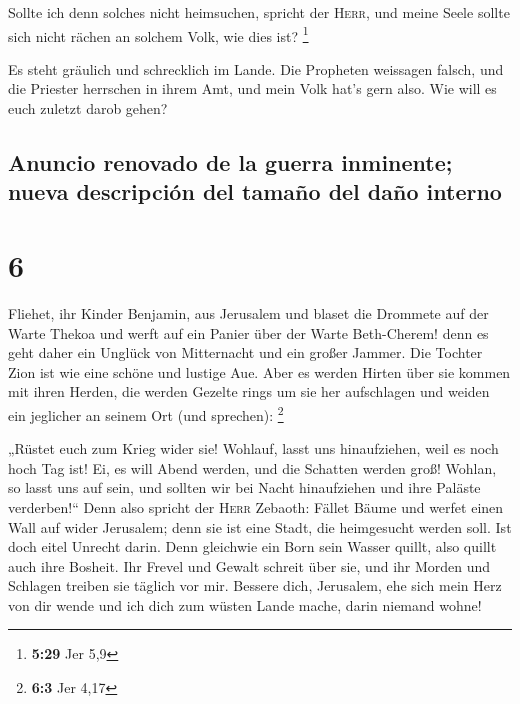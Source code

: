  Sollte ich denn solches nicht heimsuchen, spricht der
\textsc{Herr}, und meine Seele sollte sich nicht rächen an solchem Volk,
wie dies ist? \footnote{\textbf{5:29} Jer 5,9}

 Es steht gräulich und schrecklich im Lande.
 Die Propheten weissagen falsch, und die Priester
herrschen in ihrem Amt, und mein Volk hat's gern also. Wie will es euch
zuletzt darob gehen?

\hypertarget{anuncio-renovado-de-la-guerra-inminente-nueva-descripciuxf3n-del-tamauxf1o-del-dauxf1o-interno}{%
\subsection{Anuncio renovado de la guerra inminente; nueva descripción
del tamaño del daño
interno}\label{anuncio-renovado-de-la-guerra-inminente-nueva-descripciuxf3n-del-tamauxf1o-del-dauxf1o-interno}}

\hypertarget{section-5}{%
\section{6}\label{section-5}}

 Fliehet, ihr Kinder Benjamin, aus Jerusalem und blaset
die Drommete auf der Warte Thekoa und werft auf ein Panier über der
Warte Beth-Cherem! denn es geht daher ein Unglück von Mitternacht und
ein großer Jammer.  Die Tochter Zion ist wie eine schöne
und lustige Aue.  Aber es werden Hirten über sie kommen
mit ihren Herden, die werden Gezelte rings um sie her aufschlagen und
weiden ein jeglicher an seinem Ort (und sprechen): \footnote{\textbf{6:3}
  Jer 4,17}

 „Rüstet euch zum Krieg wider sie! Wohlauf, lasst uns
hinaufziehen, weil es noch hoch Tag ist! Ei, es will Abend werden, und
die Schatten werden groß!  Wohlan, so lasst uns auf sein,
und sollten wir bei Nacht hinaufziehen und ihre Paläste verderben!{}``
 Denn also spricht der \textsc{Herr} Zebaoth: Fället Bäume
und werfet einen Wall auf wider Jerusalem; denn sie ist eine Stadt, die
heimgesucht werden soll. Ist doch eitel Unrecht darin. 
Denn gleichwie ein Born sein Wasser quillt, also quillt auch ihre
Bosheit. Ihr Frevel und Gewalt schreit über sie, und ihr Morden und
Schlagen treiben sie täglich vor mir.  Bessere dich,
Jerusalem, ehe sich mein Herz von dir wende und ich dich zum wüsten
Lande mache, darin niemand wohne!

